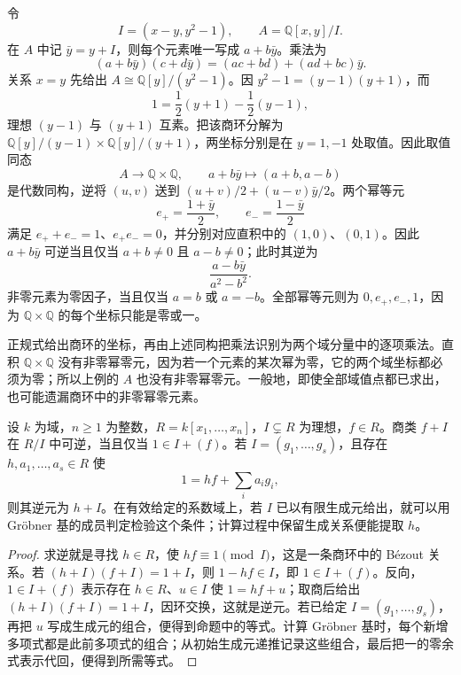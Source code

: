 \begin{example}\label{b1:exm:F-two-point-algebra}
	令
	\[
		I=(x-y,y^2-1),\qquad A=\mathbb Q[x,y]/I.
	\]
	在 \(A\) 中记 \(\bar y=y+I\)，则每个元素唯一写成 \(a+b\bar y\)。乘法为
	\[
		(a+b\bar y)(c+d\bar y)=(ac+bd)+(ad+bc)\bar y.
	\]
	关系 \(x=y\) 先给出 \(A\cong\mathbb Q[y]/(y^2-1)\)。因 \(y^2-1=(y-1)(y+1)\)，而
	\[
		1=\frac12(y+1)-\frac12(y-1),
	\]
	理想 \((y-1)\) 与 \((y+1)\) 互素。把该商环分解为 \(\mathbb Q[y]/(y-1)\times\mathbb Q[y]/(y+1)\)，两坐标分别是在 \(y=1,-1\) 处取值。因此取值同态
	\begin{equation}\label{b1:eq:F-two-point-evaluation}
		A\longrightarrow\mathbb Q\times\mathbb Q, \qquad a+b\bar y\longmapsto(a+b,a-b)
	\end{equation}
	是代数同构，逆将 \((u,v)\) 送到 \((u+v)/2+(u-v)\bar y/2\)。两个幂等元
	\[
		e_+=\frac{1+\bar y}{2},\qquad e_-=\frac{1-\bar y}{2}
	\]
	满足 \(e_++e_-=1\)、\(e_+e_-=0\)，并分别对应直积中的 \((1,0)\)、\((0,1)\)。因此 \(a+b\bar y\) 可逆当且仅当 \(a+b\ne0\) 且 \(a-b\ne0\)；此时其逆为
	\[
		\frac{a-b\bar y}{a^2-b^2}.
	\]
	非零元素为零因子，当且仅当 \(a=b\) 或 \(a=-b\)。全部幂等元则为 \(0,e_+,e_-,1\)，因为 \(\mathbb Q\times\mathbb Q\) 的每个坐标只能是零或一。
\end{example}

正规式给出商环的坐标，再由上述同构把乘法识别为两个域分量中的逐项乘法。直积 \(\mathbb Q\times\mathbb Q\) 没有非零幂零元，因为若一个元素的某次幂为零，它的两个域坐标都必须为零；所以上例的 \(A\) 也没有非零幂零元。一般地，即使全部域值点都已求出，也可能遗漏商环中的非零幂零元素。

\begin{proposition}[单位判据]\label{b1:prop:F-unit-criterion}
	设 \(k\) 为域，\(n\geq1\) 为整数，\(R=k[x_1,\ldots,x_n]\)，\(I\subsetneq R\) 为理想，\(f\in R\)。商类 \(f+I\) 在 \(R/I\) 中可逆，当且仅当 \(1\in I+(f)\)。若 \(I=(g_1,\ldots,g_s)\)，且存在 \(h,a_1,\ldots,a_s\in R\) 使
	\[
		1=hf+\sum_i a_i g_i,
	\]
	则其逆元为 \(h+I\)。在有效给定的系数域上，若 \(I\) 已以有限生成元给出，就可以用 Gröbner 基的成员判定检验这个条件；计算过程中保留生成关系便能提取 \(h\)。
\end{proposition}
\begin{proof}
	求逆就是寻找 \(h\in R\)，使 \(hf\equiv1\pmod I\)，这是一条商环中的 Bézout 关系。若 \((h+I)(f+I)=1+I\)，则 \(1-hf\in I\)，即 \(1\in I+(f)\)。反向，\(1\in I+(f)\) 表示存在 \(h\in R\)、\(u\in I\) 使 \(1=hf+u\)；取商后给出 \((h+I)(f+I)=1+I\)，因环交换，这就是逆元。若已给定 \(I=(g_1,\ldots,g_s)\)，再把 \(u\) 写成生成元的组合，便得到命题中的等式。计算 Gröbner 基时，每个新增多项式都是此前多项式的组合；从初始生成元递推记录这些组合，最后把一的零余式表示代回，便得到所需等式。
\end{proof}

